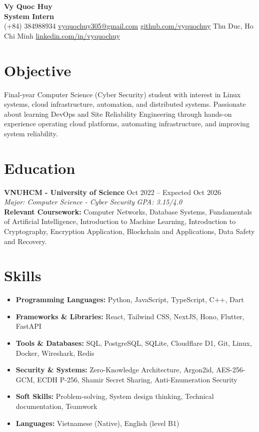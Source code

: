 \documentclass[10pt,a4paper]{article}
\begin{document}
\pagestyle{empty}

\begin{center}
    {\huge \textbf{Vy Quoc Huy}} \\ \vspace{4pt}
    {\Large \textbf{System Intern}} \\ \vspace{4pt}
    (+84) 384988934 \quad \href{mailto:vyquochuy305@gmail.com}{vyquochuy305@gmail.com} \quad \href{https://github.com/vyquochuy}{github.com/vyquochuy} \quad Thu Duc, Ho Chi Minh \quad \href{https://www.linkedin.com/in/vyquochuy/}{linkedin.com/in/vyquochuy}
\end{center}

\section*{Objective}
Final-year Computer Science (Cyber Security) student with interest in Linux systems, cloud infrastructure, automation, and distributed systems. Passionate about learning DevOps and Site Reliability Engineering through hands-on experience operating cloud platforms, automating infrastructure, and improving system reliability.

\section*{Education}
\noindent \textbf{VNUHCM - University of Science} \hfill Oct 2022 -- Expected Oct 2026\\
\textit{Major: Computer Science - Cyber Security} \hfill \textit{GPA: 3.15/4.0}\\
\textbf{Relevant Coursework:} Computer Networks, Database Systems, Fundamentals of Artificial Intelligence, Introduction to Machine Learning, Introduction to Cryptography, Encryption Application, Blockchain and Applications, Data Safety and Recovery.

\section*{Skills}
\begin{itemize}[leftmargin=0.15in, label={}, itemsep=0pt]
    \item \textbf{Programming Languages:} Python, JavaScript, TypeScript, C++, Dart
    \item \textbf{Frameworks \& Libraries:} React, Tailwind CSS, NextJS, Hono, Flutter, FastAPI
    \item \textbf{Tools \& Databases:} SQL, PostgreSQL, SQLite, Cloudflare D1, Git, Linux, Docker, Wireshark, Redis
    \item \textbf{Security \& Systems:} Zero-Knowledge Architecture, Argon2id, AES-256-GCM, ECDH P-256, Shamir Secret Sharing, Anti-Enumeration Security
    \item \textbf{Soft Skills:} Problem-solving, System design thinking, Technical documentation, Teamwork
    \item \textbf{Languages:} Vietnamese (Native), English (level B1)
\end{itemize}
\end{document}
